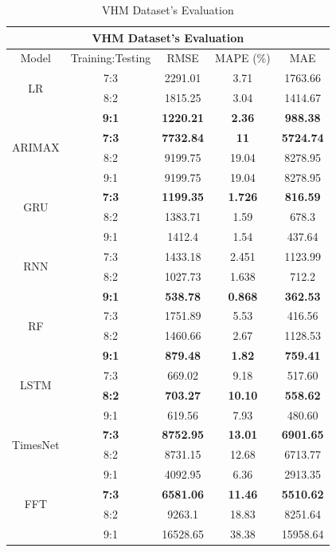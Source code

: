 \documentclass{ieeeojies}
\begin{document}
  \begin{table}[H]
    \centering
    \begin{tabular}{|c|c|c|c|c|}
           \hline
           \multicolumn{5}{|c|}{\textbf{VHM Dataset's Evaluation}}\\
           \hline
           \centering Model & Training:Testing & RMSE & MAPE (\%) & MAE\\
           \hline
           \multirow{2}{*}{LR} & 7:3 & 2291.01 & 3.71 & 1763.66 \\ & 8:2 & 1815.25 & 3.04 & 1414.67 \\ & \textbf{9:1} & \textbf{1220.21} & \textbf{2.36} & \textbf{988.38}\\
           \hline
           \multirow{2}{*}{ARIMAX} & \textbf{7:3} &\textbf{7732.84} &\textbf{11}&\textbf{5724.74}\\ & 8:2& 9199.75&19.04&8278.95 \\ & 9:1& 9199.75 & 19.04 & 8278.95\\
           \hline
           \multirow{2}{*}{GRU} & \textbf{7:3} & \textbf{1199.35} & \textbf{1.726} & \textbf{816.59} \\ & 8:2 &  1383.71 & 1.59 &678.3 \\ & 9:1 & 1412.4	&1.54&437.64\\
           \hline
           \multirow{2}{*}{RNN} & 7:3 &  1433.18 &  2.451 & 1123.99 \\ & 8:2 &  1027.73 & 1.638 &  712.2\\ & \textbf{9:1} & \textbf{538.78} & \textbf{0.868} & \textbf{362.53} \\
           \hline
           \multirow{2}{*}{RF} & 7:3	& 1751.89 & 5.53 &  416.56 \\ & 8:2 & 1460.66 & 2.67 & 1128.53 \\ & \textbf{9:1} & \textbf{879.48} & \textbf{1.82} & \textbf{759.41}\\
           \hline
           \multirow{2}{*}{LSTM} & 7:3 & 669.02 & 9.18 & 517.60 \\ & \textbf{8:2} & \textbf{703.27} & \textbf{10.10} & \textbf{558.62} \\ & 9:1 & 619.56	&7.93&480.60\\
           \hline
           \multirow{2}{*}{TimesNet} & \textbf{7:3} & \textbf{8752.95} & \textbf{13.01} & \textbf{6901.65} \\ & 8:2 & 8731.15 & 12.68 & 6713.77 \\ & 9:1 & 4092.95	& 6.36 &2913.35\\
           \hline
           \multirow{2}{*}{FFT} & \textbf{7:3} & \textbf{6581.06} & \textbf{11.46} &  \textbf{5510.62} \\ & 8:2 & 9263.1 &  18.83 &  8251.64 \\ & 9:1 & 16528.65 & 38.38 & 15958.64\\
           \hline
      \end{tabular}
      \caption{VHM Dataset's Evaluation}
      \label{vcbresult}
  \end{table}
\end{document}
